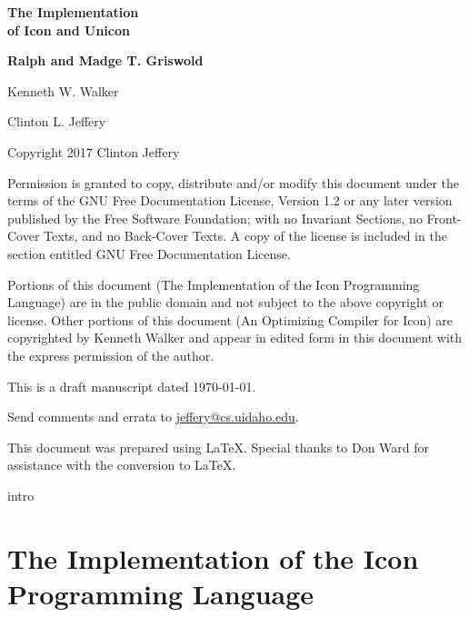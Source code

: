 \documentclass[letterpaper,twoside,12pt]{book}
\begin{document}
\bigskip
\bigskip
\bigskip

{\centering\bfseries\Huge
The Implementation\\
of Icon and Unicon
\par}

\bigskip
\bigskip
\bigskip
\bigskip
\bigskip
\bigskip
\bigskip

{\raggedleft\bfseries\Large
Ralph and Madge T. Griswold
\par
Kenneth W. Walker
\par
Clinton L. Jeffery 
\par}

\bigskip
\bigskip
\bigskip

\clearpage\setcounter{page}{1}\pagestyle{KonvertFolgeii}
\frontmatter
\bigskip
\bigskip
\noindent Copyright {\textcopyright} 2017 Clinton Jeffery


\noindent Permission is granted to copy, distribute and/or modify this
document under the terms of the GNU Free Documentation License,
Version 1.2 or any later version published by the Free Software
Foundation; with no Invariant Sections, no Front-Cover Texts, and no
Back-Cover Texts. A copy of the license is included in the section
entitled {\textquotedbl}GNU Free Documentation License{\textquotedbl}.


Portions of this document ({\textquotedbl}The Implementation of the
Icon Programming Language{\textquotedbl}) are in the public domain and
not subject to the above copyright or license. Other portions of this
document ({\textquotedbl}An Optimizing Compiler for
Icon{\textquotedbl}) are copyrighted by Kenneth Walker and appear in
edited form in this document with the express permission of the
author.


\bigskip

\noindent This is a draft manuscript dated \today.

\noindent Send comments and errata to
\href{mailto:jeffery@cs.uidaho.edu}{jeffery@cs.uidaho.edu}.

\bigskip

\noindent This document was prepared using \LaTeX. Special thanks to Don Ward
for assistance with the conversion to \LaTeX.

\setcounter{tocdepth}{3}
\tableofcontents


\mainmatter
 {intro}

\part{The Implementation of the Icon Programming Language}
\end{document}
